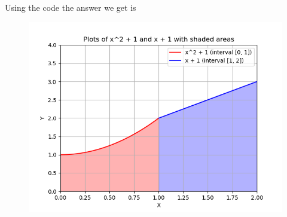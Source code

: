 \documentclass[journal]{IEEEtran}
\begin{document}
Using the code the answer we get is
\begin{figure}[!h]
	\centering
	\includegraphics[width = \columnwidth]{figs/Figure_1.png}
	\label{fig}
\end{figure}
\end{document}
